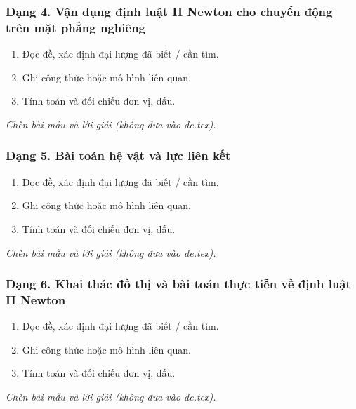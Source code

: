 \subsubsection{Dạng 4. Vận dụng định luật II Newton cho chuyển động trên mặt phẳng nghiêng}
\begin{phuongphap}
\begin{enumerate}
\item Đọc đề, xác định đại lượng đã biết / cần tìm.
\item Ghi công thức hoặc mô hình liên quan.
\item Tính toán và đối chiếu đơn vị, dấu.
\end{enumerate}
\end{phuongphap}
\begin{vidumau}
\textit{Chèn bài mẫu và lời giải (không đưa vào de.tex).}
\end{vidumau}

\subsubsection{Dạng 5. Bài toán hệ vật và lực liên kết}
\begin{phuongphap}
\begin{enumerate}
\item Đọc đề, xác định đại lượng đã biết / cần tìm.
\item Ghi công thức hoặc mô hình liên quan.
\item Tính toán và đối chiếu đơn vị, dấu.
\end{enumerate}
\end{phuongphap}
\begin{vidumau}
\textit{Chèn bài mẫu và lời giải (không đưa vào de.tex).}
\end{vidumau}

\subsubsection{Dạng 6. Khai thác đồ thị và bài toán thực tiễn về định luật II Newton}
\begin{phuongphap}
\begin{enumerate}
\item Đọc đề, xác định đại lượng đã biết / cần tìm.
\item Ghi công thức hoặc mô hình liên quan.
\item Tính toán và đối chiếu đơn vị, dấu.
\end{enumerate}
\end{phuongphap}
\begin{vidumau}
\textit{Chèn bài mẫu và lời giải (không đưa vào de.tex).}
\end{vidumau}

